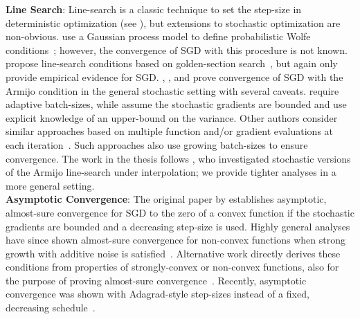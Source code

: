 \noindent \textbf{Line Search}:
Line-search is a classic technique to set the step-size in deterministic optimization (see \citet{nocedal1999numerical}), but extensions to stochastic optimization are non-obvious. 
\citet{mahsereci2017pls} use a Gaussian process model to define probabilistic Wolfe conditions~\citep{wolfe1969convergence, wolfe1971convergence}; however, the convergence of \ac{SGD} with this procedure is not known.
\citet{fridovich2019choosing} propose line-search conditions based on golden-section search~\citep{avriel1968golden}, but again only provide empirical evidence for \ac{SGD}. 
\citet{paquette2020stochastic}, \citet{krejic2013line}, and \citet{ogaltsov2019adaptive} prove convergence of \ac{SGD} with the Armijo condition in the general stochastic setting with several caveats. 
\citet{paquette2020stochastic} require adaptive batch-sizes, while \citet{krejic2013line} assume the stochastic gradients are bounded and \citet{ogaltsov2019adaptive} use explicit knowledge of an upper-bound on the variance. 
Other authors consider similar approaches based on multiple function and/or gradient evaluations at each iteration~\citep{friedlander2012hybrid, byrd2012sample, de2016big}.
Such approaches also use growing batch-sizes to ensure convergence.
The work in the thesis follows \citet{vaswani2019painless}, who investigated stochastic versions of the Armijo line-search under interpolation; we provide tighter analyses in a more general setting.\\ 


\noindent \textbf{Asymptotic Convergence}:
The original paper by \citet{robbins1951sgd} establishes asymptotic, almost-sure convergence for \ac{SGD} to the zero of a convex function if the stochastic gradients are bounded and a decreasing step-size is used.
Highly general analyses have since shown almost-sure convergence for non-convex functions when strong growth with additive noise is satisfied~\citep{bertsekas2000gradient, bottou1991approche}.
Alternative work directly derives these conditions from properties of strongly-convex or non-convex functions, also for the purpose of proving almost-sure convergence~\citep{nguyen2018sgd, lei2019stochastic}.
Recently, asymptotic convergence was shown with Adagrad-style step-sizes instead of a fixed, decreasing schedule~\citep{li2019convergence}.


\endinput
